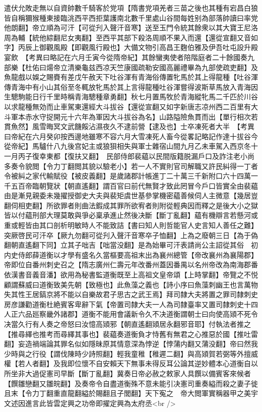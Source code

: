 遣伏允敗走無以自資帥數千騎客於党項【隋書党項羌者三苗之後也其種有宕昌白狼皆自稱獮猴種東接臨洮西平西拒葉護南北數千里處山谷間每姓别為部落帥讀曰率党他朗翻】帝立順為可汗【可從刋入聲汗音寒】送至玉門令統其餘衆以其大寶王尼洛周為輔【統他綜翻尼女夷翻】至西平其部下殺洛周順不果入而還【還從宣翻又音如字】丙辰上御觀風殿【即觀風行殿也】大備文物引高昌王麴伯雅及伊吾吐屯設升殿宴飲　【考異曰略記在六月壬寅今從隋帝紀】其餘蠻夷使者陪階庭者二十餘國奏九部樂【杜佑曰煬帝立清樂龜兹西凉天竺康國疏勒安國高麗禮畢為九部使疏吏翻】及魚龍戲以娛之賜賚有差戊午赦天下吐谷渾有青海俗傳置牝馬於其上得龍種【吐谷渾傳青海中有小山其俗至冬輒放牝馬於其上言得龍種吐谷渾嘗得波斯草馬放入青海因生驄駒能日行千里時稱青海驄種章勇翻】秋七月置馬牧於青海縱牝馬二千匹於川谷以求龍種無効而止車駕東還經大斗拔谷【還從宣翻又如字新唐志凉州西二百里有大斗軍本赤水守捉開元十六年為軍因大斗拔谷為名】山路隘險魚貫而出【單行相次若貫魚然】風雪晦冥文武饑餒沾濕夜久不逮前營【逮及也】士卒凍死者大半　【考異曰帝紀在六月癸卯按西邊地雖寒不容六月大雪凍死人畜今從畧記略記作達十拔谷今從帝紀】馬驢什八九後宫妃主或狼狽相失與軍士雜宿山間九月乙未車駕入西京冬十一月丙子復幸東都【復扶又翻】　民部侍郎裴藴以民間版籍脱漏戶口及詐注老小尚多奏令貌閲【令力丁翻閲其貌以驗老小】若一人不實則官司解職又許民糾得一丁者令被糾之家代輸賦役【被皮義翻】是歲諸郡計帳進丁二十萬三千新附口六十四萬一千五百帝臨朝覽狀【朝直遙翻】謂百官曰前代無賢才致此罔冒今戶口皆實全由裴藴由是漸見親委未幾擢授御史大夫與裴矩虞世基參掌機密藴善候伺人主微意【幾居豈翻伺相吏翻】所欲罪者則曲法鍜成其罪所欲宥者則附從輕典因而釋之是後大小之獄皆以付藴刑部大理莫敢與爭必稟承進止然後决斷【斷丁亂翻】藴有機辯言若懸河或重或輕皆由其口剖析明敏時人不能致詰【書曰知人則哲能官人史言知人善任之難】　突厥啓民可汗卒【厥九勿翻可從刋入聲汗音寒卒子恤翻】上為之廢朝三日【為于偽翻朝直遙翻下同】立其子咄吉【咄當没翻】是為始畢可汗表請尚公主詔從其俗　初内史侍郎薛道衡以才學有盛名久當樞要高祖末出為襄州總管【帝改襄州為襄陽郡】帝即位自番州刺史召之【隋志廣州仁壽元年改番州蓋因番禺以名州帝改為南海郡番依漢書音義音潘】欲用為秘書監道衡既至上高祖文皇帝頌【上時掌翻】帝覽之不悦顧謂蘇威曰道衡致美先朝【致極也】此魚藻之義也【詩小序曰魚藻刺幽王也言萬物失其性王居鎬京將不能以自樂故君子思古之武王焉】拜司隸大夫將置之罪司隸刺史房彦謙勸道衡杜絶賓客卑辭下氣【帝置司隸大夫一人為司隸臺率又置司隸刺史十四人正六品廵察畿外諸郡】道衡不能用會議新令久不决道衡謂朝士曰向使高熲不死令决當久行有人奏之帝怒曰汝憶高熲邪【朝直遙翻熲居永翻邪音耶】付執法者推之【推尋繹也推考而尋繹其事也】裴藴奏道衡負才恃舊有無君之心推惡於國【推吐雷翻】妄造禍端論其罪名似如隱昧原其情意深為悖逆【悖蒲内翻又蒲没翻】帝曰然我少時與之行役【謂伐陳時少詩照翻】輕我童稚【稚遲二翻】與高熲賀若弼等外擅威權【若人者翻】及我即位懷不自安賴天下無事未得反耳公論其逆妙體本心道衡自以所坐非大過促憲司早斷【斷丁亂翻】冀奏日帝必赦之敕家人具饌以備賓客來候者【饌雛戀翻又雛皖翻】及奏帝令自盡道衡殊不意未能引决憲司重奏縊而殺之妻子徙且末【令力丁翻重直龍翻縊於賜翻且子閭翻】天下寃之　帝大閲軍實稱器甲之美宇文述因進言此皆雲定興之功帝即擢定興為太府丞<br />

